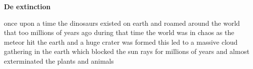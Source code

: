 \documentclass[a4paper,12pt]{article}
\begin{document}
\begin{center}
{\Large \textbf{De extinction} } \\
\end{center}

once upon a time the dinosaurs existed on earth and roamed around the world
that too millions of years ago \cite{millions} during that time the world was in chaos as the meteor hit the earth and a huge crater was formed \cite{crater} this led to a massive cloud gathering in the earth which blocked the sun rays for millions of years and almost exterminated the plants and animals \cite{cloud} 




\end{document}
